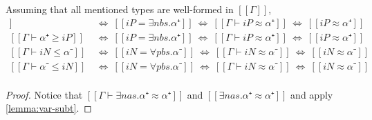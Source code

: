 \begin{corollary}
  \label{corollary:vars-no-proper-subtypes}
  Assuming that all mentioned types are well-formed in $[[Γ]]$,
  \begin{align*}
    [[Γ ⊢ iP ≥ α⁺]] ~ &\iff ~ [[iP = ∃nbs.α⁺]]  ~ \iff ~ [[Γ ⊢ iP ≈ α⁺]] ~ \iff ~ [[iP ≈ α⁺]]\\
    [[Γ ⊢ α⁺≥ iP]]  ~ &\iff ~ [[iP = ∃nbs.α⁺]]  ~ \iff ~ [[Γ ⊢ iP ≈ α⁺]] ~ \iff ~ [[iP ≈ α⁺]]\\
    [[Γ ⊢ iN ≤ α⁻]] ~ &\iff ~ [[iN = ∀pbs.α⁻]]  ~ \iff ~ [[Γ ⊢ iN ≈ α⁻]] ~ \iff ~ [[iN ≈ α⁻]]\\
    [[Γ ⊢ α⁻ ≤ iN]] ~ &\iff ~ [[iN = ∀pbs.α⁻]]  ~ \iff ~ [[Γ ⊢ iN ≈ α⁻]] ~ \iff ~ [[iN ≈ α⁻]]\\
  \end{align*}
\end{corollary}
\begin{proof}
  Notice that $[[Γ ⊢ ∃nas.α⁺ ≈ α⁺]]$ and $[[∃nas.α⁺ ≈ α⁺]]$ and apply
  \cref{lemma:var-subt}.
\end{proof}
















